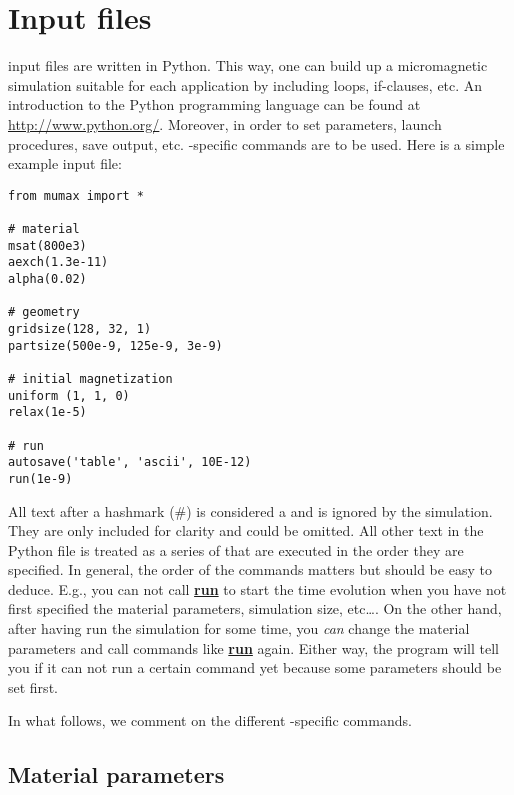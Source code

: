 \section{Input files}

\newcommand{\command}[1]{\hyperref[#1]{\textbf{#1}}\index{#1}\label{#1}}

\mumax input files are written in Python. This way, one can build up a micromagnetic simulation suitable for each application by including loops, if-clauses, etc.  An introduction to the Python programming language can be found at \url{http://www.python.org/}.  Moreover, in order to set parameters, launch procedures, save output, etc. \mumax-specific commands are to be used.  Here is a simple example input file: 

\begin{verbatim}
from mumax import *

# material
msat(800e3)
aexch(1.3e-11)
alpha(0.02)

# geometry 
gridsize(128, 32, 1)
partsize(500e-9, 125e-9, 3e-9)

# initial magnetization
uniform	(1, 1, 0)
relax(1e-5)

# run
autosave('table', 'ascii', 10E-12)
run(1e-9)
\end{verbatim}                                                                                                                                            

All text after a hashmark (\#) is considered a  and is ignored by the simulation.  They are only included for clarity and could be omitted.  All other text in the Python file is treated as a series of  that are executed in the order they are specified. In general, the order of the commands matters but should be easy to deduce.  E.g., you can not call \command{run} to start the time evolution when you have not first specified the material parameters, simulation size, etc\ldots. On the other hand, after having {run} the simulation for some time, you \emph{can} change the material parameters and call commands like \command{run} again. Either way, the program will tell you if it can not run a certain command yet because some parameters should be set first.

In what follows, we comment on the different \mumax-specific commands.

\subsection{Material parameters}

